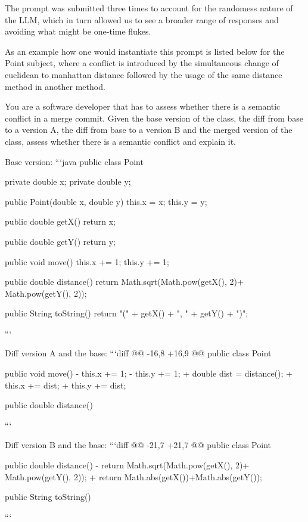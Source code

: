The prompt was submitted three times to account for the randomess nature of the
LLM, which in turn allowed us to see a broader range of responses and avoiding
what might be one-time flukes.

As an example how one would instantiate this prompt is listed below for the
Point subject, where a conflict is introduced by the simultaneous change of
euclidean to manhattan distance followed by the usage of the same distance method
in another method.
\begin{prompt}
You are a software developer that has to assess whether there is a semantic conflict in a merge commit.  Given the base version of the class, the diff from base to a version A, the diff from base to a version B and the merged version of the class, assess whether there is a semantic conflict and explain it.

Base version:
```java
public class Point {
    private double x;
    private double y;

    public Point(double x, double y) {
        this.x = x;
        this.y = y;
    }

    public double getX() {
        return x;
    }

    public double getY() {
        return y;
    }

      public void move() {
          this.x += 1;
          this.y += 1;
      }

    public double distance() {
        return Math.sqrt(Math.pow(getX(), 2)+ Math.pow(getY(), 2));
    }

    public String toString() {
        return "(" + getX() + ", " + getY() + ")";
    }
}
```

Diff version A and the base:
```diff
@@ -16,8 +16,9 @@ public class Point {
      }

      public void move() {
-         this.x += 1;
-         this.y += 1;
+         double dist = distance();
+         this.x += dist;
+         this.y += dist;
      }

      public double distance() {
```

Diff version B and the base:
```diff
@@ -21,7 +21,7 @@ public class Point {
      }

      public double distance() {
-        return Math.sqrt(Math.pow(getX(), 2)+ Math.pow(getY(), 2));
+        return Math.abs(getX())+Math.abs(getY());
      }

      public String toString() {
```

}}
\end{prompt}
